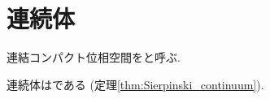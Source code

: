 \documentclass[uplatex, dvipdfmx, a4paper, 12pt, class=jsbook, crop=false]{standalone}
\begin{document}
\section{連続体}
\label{sec:continuum}

\begin{definition}
	連結コンパクト\Hausdorff 位相空間をと呼ぶ.
\end{definition}

連続体は\sigmaConnected である (定理\ref{thm:Sierpinski_continuum}).
\end{document}
